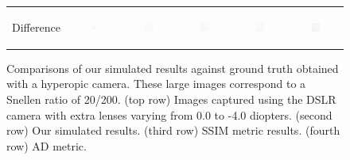 \begin{figure}[!h]
\begin{tabular}{@{}r@{ } c@{ } c@{ } c@{ } c@{ } c }
	\begin{sideways} \parbox[b]{20mm} {Difference} \end{sideways} &
	\includegraphics[width=0.185\textwidth]{__Images/05/WB_N(20-200)_-0D_to_-4D/wb_N_20-200_Camera-0,00D(diff).png} &
	\includegraphics[width=0.185\textwidth]{__Images/05/WB_N(20-200)_-0D_to_-4D/wb_N_20-200_Camera-1,00D(diff).png} &
	\includegraphics[width=0.185\textwidth]{__Images/05/WB_N(20-200)_-0D_to_-4D/wb_N_20-200_Camera-2,00D(diff).png} &
	\includegraphics[width=0.185\textwidth]{__Images/05/WB_N(20-200)_-0D_to_-4D/wb_N_20-200_Camera-3,00D(diff).png} &
	\includegraphics[width=0.185\textwidth]{__Images/05/WB_N(20-200)_-0D_to_-4D/wb_N_20-200_Camera-4,00D(diff).png} \\
 
	\end{tabular}
	
	\caption[Comparisons of our simulated results against ground truth obtained with a hyperopic camera]{Comparisons of our simulated results against ground truth obtained with a hyperopic camera. These large images correspond to a Snellen ratio of 20/200. (top row) Images captured using the DSLR camera with extra lenses varying from 0.0 to -4.0 diopters. (second row) Our simulated results. (third row) SSIM metric results. (fourth row) AD metric.}
	\label{fig:comparison_hyperopic_wb}
\end{figure}